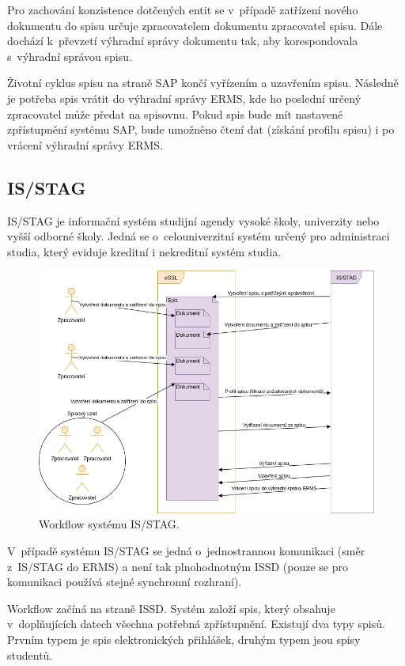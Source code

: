 \documentclass[
  master,
  field=ainfp,
  biblatex,
  language=czech,
  glossaries,
  theorems=false,
  index
]{kidiplom}
\begin{document}
Pro zachování konzistence dotčených entit se v~případě zatřízení nového dokumentu do spisu určuje zpracovatelem dokumentu zpracovatel spisu. Dále dochází k~převzetí výhradní správy dokumentu tak, aby korespondovala s~výhradní správou spisu.

Životní cyklus spisu na straně SAP končí vyřízením a uzavřením spisu. Následně je potřeba spis vrátit do výhradní správy ERMS, kde ho poslední určený zpracovatel může předat na spisovnu.
Pokud spis bude mít nastavené zpřístupnění systému SAP, bude umožněno čtení dat (získání profilu spisu) i po vrácení výhradní správy ERMS.
 

\subsection{IS/STAG}
IS/STAG je informační systém studijní agendy vysoké školy, univerzity nebo vyšší odborné školy. Jedná se o~celouniverzitní systém určený pro administraci studia, který eviduje kreditní i nekreditní systém studia.

\begin{figure}[h]
  \centerline{\includegraphics[width=0.9\linewidth]{./images/STAGworkflow.png}} 
  \caption{Workflow systému IS/STAG.} 
\end{figure}
V~případě systému IS/STAG se jedná o~jednostrannou komunikaci (směr z~IS/STAG do ERMS) a není tak plnohodnotným ISSD (pouze se pro komunikaci používá stejné synchronní rozhraní).

Workflow začíná na straně ISSD. Systém založí spis, který obsahuje v~doplňujících datech všechna potřebná zpřístupnění. Existují dva typy spisů. Prvním typem je spis elektronických přihlášek, druhým typem jsou spisy studentů.
\end{document}
